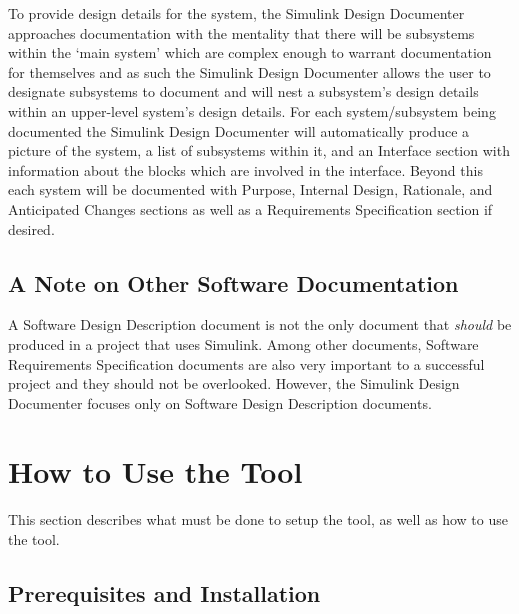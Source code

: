 \documentclass{article}
\makeatletter
\newcommand{\ToolName}{Simulink Design Documenter\@\xspace}
\newcommand{\sdd}{Software Design Description\@\xspace}
\makeatother
\begin{document}
To provide design details for the system, the \ToolName approaches documentation with the mentality that there will be subsystems within the `main system' which are complex enough to warrant documentation for themselves and as such the \ToolName allows the user to designate subsystems to document and will nest a subsystem's design details within an upper-level system's design details. 
For each system/subsystem being documented the \ToolName will automatically produce 
a picture of the system, a list of subsystems within it, and an Interface section with information about the blocks which are involved in the interface.
Beyond this each system will be documented with 
Purpose, Internal Design, Rationale, and Anticipated Changes sections 
as well as a Requirements Specification section if desired.

\subsection*{A Note on Other Software Documentation}
A \sdd document is not the only document that \emph{should} be produced in a project that uses Simulink. Among other documents, Software Requirements Specification documents are also very important to a successful project and they should not be overlooked. However, the \ToolName{} focuses only on \sdd documents.

\newpage	
\section{How to Use the Tool}
This section describes what must be done to setup the tool, as well as how to use the tool.

\subsection{Prerequisites and Installation}
\end{document}

